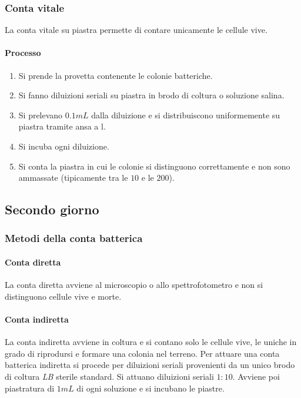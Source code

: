 		\subsubsection{Conta vitale}
		La conta vitale su piastra permette di contare unicamente le cellule vive.

			\paragraph{Processo}
			\begin{enumerate}
				\item Si prende la provetta contenente le colonie batteriche.
				\item Si fanno diluizioni seriali su piastra in brodo di coltura o soluzione salina.
				\item Si prelevano $0.1\si{mL}$ dalla diluizione e si distribuiscono uniformemente su piastra tramite ansa a l.
				\item Si incuba ogni diluizione.
				\item Si conta la piastra in cui le colonie si distinguono correttamente e non sono ammassate (tipicamente tra le $10$ e le $200$).
			\end{enumerate}
	\subsection{Secondo giorno}

		\subsubsection{Metodi della conta batterica}
		
			\paragraph{Conta diretta}
			La conta diretta avviene al microscopio o allo spettrofotometro e non si distinguono cellule vive e morte.

			\paragraph{Conta indiretta}
			La conta indiretta avviene in coltura e si contano solo le cellule vive, le uniche in grado di riprodursi e formare una colonia nel terreno.
			Per attuare una conta batterica indiretta si procede per diluizioni seriali provenienti da un unico brodo di coltura \emph{LB} sterile standard.
			Si attuano diluizioni seriali $1:10$.
			Avviene poi piastratura di $1\si{mL}$ di ogni soluzione e si incubano le piastre.

